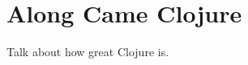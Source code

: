 \chapter{Along Came Clojure}
\label{chap:along-came-clojure}
	Talk about how great Clojure is.
	
	
	